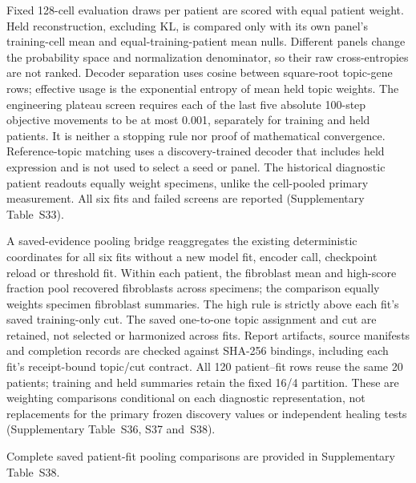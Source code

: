 \documentclass[10pt,a4paper]{article}
\begin{document}
Fixed 128-cell evaluation draws per patient are scored with equal patient weight. Held reconstruction, excluding KL, is compared only with its own panel's training-cell mean and equal-training-patient mean nulls. Different panels change the probability space and normalization denominator, so their raw cross-entropies are not ranked. Decoder separation uses cosine between square-root topic-gene rows; effective usage is the exponential entropy of mean held topic weights. The engineering plateau screen requires each of the last five absolute 100-step objective movements to be at most 0.001, separately for training and held patients. It is neither a stopping rule nor proof of mathematical convergence. Reference-topic matching uses a discovery-trained decoder that includes held expression and is not used to select a seed or panel. The historical diagnostic patient readouts equally weight specimens, unlike the cell-pooled primary measurement. All six fits and failed screens are reported (Supplementary Table~S33).

A saved-evidence pooling bridge reaggregates the existing deterministic coordinates for all six fits without a new model fit, encoder call, checkpoint reload or threshold fit. Within each patient, the fibroblast mean and high-score fraction pool recovered fibroblasts across specimens; the comparison equally weights specimen fibroblast summaries. The high rule is strictly above each fit's saved training-only cut. The saved one-to-one topic assignment and cut are retained, not selected or harmonized across fits. Report artifacts, source manifests and completion records are checked against SHA-256 bindings, including each fit's receipt-bound topic/cut contract. All 120 patient--fit rows reuse the same 20 patients; training and held summaries retain the fixed 16/4 partition. These are weighting comparisons conditional on each diagnostic representation, not replacements for the primary frozen discovery values or independent healing tests (Supplementary Table~S36, S37 and~S38).

Complete saved patient-fit pooling comparisons are provided in Supplementary Table~S38.
\end{document}
